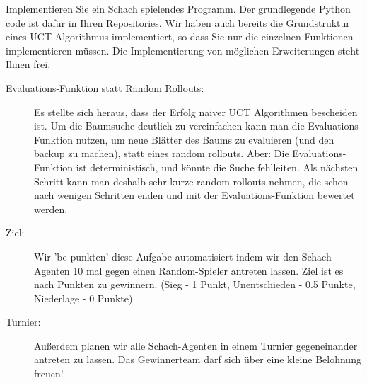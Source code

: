 

\renewcommand{\course}{Artificial Intelligence}
\renewcommand{\coursepicture}{course_ai}
\renewcommand{\coursedate}{Winter 2019}
\renewcommand{\exnum}{Exercise 2}

\exercises
{}
\exercisestitle



Implementieren Sie ein Schach spielendes Programm. Der grundlegende
Python code ist dafür in Ihren Repositories. Wir haben auch bereits
die Grundstruktur eines UCT Algorithmus implementiert, so dass Sie
nur die einzelnen Funktionen implementieren müssen. Die Implementierung von möglichen Erweiterungen steht Ihnen frei. 
\begin{description}

\item[Evaluations-Funktion statt Random Rollouts:] 
Es stellte sich heraus, dass der Erfolg naiver UCT Algorithmen
bescheiden ist.  Um die Baumsuche deutlich zu vereinfachen kann man die
Evaluations-Funktion nutzen, um neue Blätter des Baums zu evaluieren (und
    den backup zu machen), statt eines random rollouts. Aber: Die
    Evaluations-Funktion ist deterministisch, und könnte die Suche
    fehlleiten. Als nächsten Schritt kann man deshalb sehr kurze random
    rollouts nehmen, die schon nach wenigen Schritten enden und mit der
    Evaluations-Funktion bewertet werden.

\item[Ziel:] Wir 'be-punkten' diese Aufgabe automatisiert
    indem wir den Schach-Agenten 10 mal gegen einen Random-Spieler
    antreten lassen. Ziel ist es nach Punkten zu gewinnern. (Sieg - 1 Punkt, Unentschieden - 0.5 Punkte, Niederlage - 0 Punkte).


\item[Turnier:] Außerdem planen wir alle Schach-Agenten in einem Turnier gegeneinander antreten zu lassen. Das Gewinnerteam darf sich über eine kleine Belohnung freuen!

\end{description}

